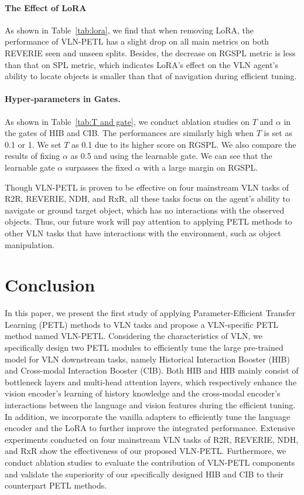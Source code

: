 \documentclass[10pt,twocolumn,letterpaper]{article}
\begin{document}
\paragraph{The Effect of LoRA}
As shown in Table~\ref{tab:lora}, we find that when removing LoRA, the performance of VLN-PETL has a slight drop on all main metrics on both REVERIE seen and unseen splits. Besides, the decrease on RGSPL metric is less than that on SPL metric, which indicates LoRA's effect on the VLN agent's ability to locate objects is smaller than that of navigation during efficient tuning.

\vspace{-8pt}
\paragraph{Hyper-parameters in Gates.}
As shown in Table~\ref{tab:T and gate}, we conduct ablation studies on $T$ and $\alpha$ in the gates of HIB and CIB. The performances are similarly high when $T$ is set as 0.1 or 1. We set $T$ as 0.1 due to its higher score on RGSPL. We also compare the results of fixing $\alpha$ as 0.5 and using the learnable gate. We can see that the learnable gate $\alpha$ surpasses the fixed $\alpha$ with a large margin on RGSPL. 

Though VLN-PETL is proven to be effective on four mainstream VLN tasks of R2R, REVERIE, NDH, and RxR, all these tasks focus on the agent's ability to navigate or ground target object, which has no interactions with the observed objects. Thus, our future work will pay attention to applying PETL methods to other VLN tasks that have interactions with the environment, such as object manipulation.


\section{Conclusion}
In this paper, we present the first study of applying Parameter-Efficient Transfer Learning (PETL) methods to VLN tasks and propose a VLN-specific PETL method named VLN-PETL. Considering the characteristics of VLN, we specifically design two PETL modules to efficiently tune the large pre-trained model for VLN downstream tasks, namely Historical Interaction Booster (HIB) and Cross-modal Interaction Booster (CIB). Both HIB and HIB mainly consist of bottleneck layers and multi-head attention layers, which respectively enhance the vision encoder's learning of history knowledge and the cross-modal encoder's interactions between the language and vision features during the efficient tuning. In addition, we incorporate the vanilla adapters to efficiently tune the language encoder and the LoRA to further improve the integrated performance. Extensive experiments conducted on four mainstream VLN tasks of R2R, REVERIE, NDH, and RxR show the effectiveness of our proposed VLN-PETL. Furthermore, we conduct ablation studies to evaluate the contribution of VLN-PETL components and validate the superiority of our specifically designed HIB and CIB to their counterpart PETL methods.

 
{\small


}
\end{document}

